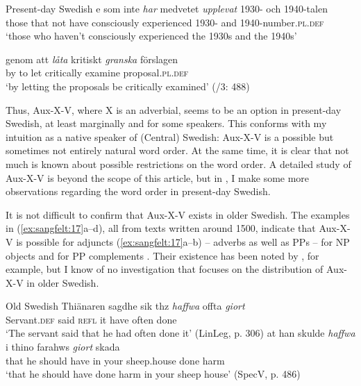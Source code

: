 \documentclass[output=paper, colorlinks, citecolor=brown]{langscibook}
\begin{document}
\ea Present-day Swedish\label{ex:sangfelt:16}
\ea\label{ex:sangfelt:16a}
\gll [d]e som inte \textit{har} {medvetet} \textit{upplevat } 1930- och 1940-talen \\
 those that not have consciously experienced 1930- and 1940-number\textsc{.pl.def}\\
\glt ‘those who haven’t consciously experienced the 1930s and the 1940s’

\ex\label{ex:sangfelt:16b}
\gll genom att \textit{låta} {kritiskt} \textit{granska} förslagen \\
 by to let critically examine proposal.\textsc{pl.def}\\
 \glt ‘by letting the proposals be critically examined’ (\citealt{TelemanEtAl1999}/3: 488)\\
\z
\z

Thus, Aux-X-V, where X is an adverbial, seems to be an option in present-day Swedish, at least marginally and for some speakers. This conforms with my intuition as a native speaker of (Central) Swedish: Aux-X-V is a possible but sometimes not entirely natural word order. At the same time, it is clear that not much is known about possible restrictions on the word order. A detailed study of Aux-X-V is beyond the scope of this article, but in , I make some more observations regarding the word order in present-day Swedish.

It is not difficult to confirm that Aux-X-V exists in older Swedish. The examples in (\ref{ex:sangfelt:17}a–d), all from texts written around 1500, indicate that Aux-X-V is possible for adjuncts (\ref{ex:sangfelt:17}a–b) – adverbs as well as PPs – for NP objects  and for PP complements . Their existence has been noted by \citet[171--172]{Falk1993}, for example, but I know of no investigation that focuses on the distribution of Aux-X-V in older Swedish.


\ea Old Swedish\label{ex:sangfelt:17}
\ea\label{ex:sangfelt:17a}
\gll Thiänaren sagdhe sik thz \textit{haffwa} {offta} \textit{giort} \\
 Servant.\textsc{def} said \textsc{refl} it have often done\\
\glt ‘The servant said that he had often done it’ (LinLeg, p. 306)
\ex\label{ex:sangfelt:17b}
\gll at han skulde \textit{haffwa} i {thino} {farahws} \textit{giort} skada \\
 that he should have in your sheep.house done harm\\
\glt ‘that he should have done harm in your sheep house’ (SpecV, p. 486)
\end{document}
